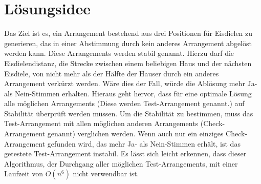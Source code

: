 \documentclass[a4paper,10pt,ngerman]{scrartcl}
\begin{document}
\section{Lösungsidee}
Das Ziel ist es, ein Arrangement bestehend aus drei Positionen für Eisdielen zu generieren, das in einer Abstimmung durch kein anderes Arrangement abgelöst werden kann.
Diese Arrangements werden stabil genannt.
Hierzu darf die Eisdielendistanz, die Strecke zwischen einem beliebigen Haus und der nächsten Eisdiele, von nicht mehr als der Hälfte der Hauser durch ein anderes Arrangement verkürzt werden.
Wäre dies der Fall, würde die Ablösung mehr Ja- als Nein-Stimmen erhalten.
Hieraus geht hervor, dass für eine optimale Lösung alle möglichen Arrangements (Diese werden Test-Arrangement genannt.) auf Stabilität überprüft werden müssen.
Um die Stabilität zu bestimmen, muss das Test-Arrangement mit allen möglichen anderen Arrangements (Check-Arrangement genannt) verglichen werden.
Wenn auch nur ein einziges Check-Arrangement gefunden wird, das mehr Ja- als Nein-Stimmen erhält, ist das getestete Test-Arrangement instabil.
Es lässt sich leicht erkennen, dass dieser Algorithmus, der Durchgang aller möglichen Test-Arrangements, mit einer Laufzeit von $O(n^6)$ nicht verwendbar ist.
\end{document}
